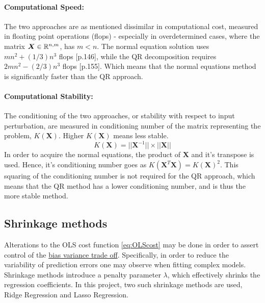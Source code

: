 \documentclass[%
oneside,                 %
final,                   %
10pt]{article}
\begin{document}
\paragraph*{Computational Speed:}
The two approaches are as mentioned dissimilar in computational cost, measured in floating point operations (flops) - especially in overdetermined cases, where the matrix $\bm{X}\in {\Bbb R}^{n,m}$, has $m<n$.
The normal equation solution uses $mn^2
+ (1/3)n^3$ flops \citep{Ascher}[p.146], while the QR decomposition requires $2mn^2−(2/3)n^3$ flops  \citep{Ascher}[p.155]. Which means that the normal equations method is significantly faster than the QR approach.


\paragraph*{Computational Stability:}
The conditioning of the two approaches, or stability with respect to input perturbation, are measured in conditioning number of the matrix representing the problem, $K(\bm{X})$. Higher $K(\bm{X})$ means less stable. 
\begin{equation}
K(\bm{X})=||\bm{X}^{-1}|| \times ||\bm{X}||
\end{equation}
In order to acquire the normal equations, the product of $\bm{X}$ and it's transpose is used. Hence, it's conditioning number goes as $K(\bm{X}^T\bm{X})=K(\bm{X})^2$. This squaring of the conditioning number is not required for the QR approach, which means that the QR method has a lower conditioning number, and is thus the more stable method.

\subsection{Shrinkage methods}
Alterations to the OLS cost function \eqref{eq:OLScost} may be done in order to assert control of the  \hyperref[S:M_Biasvar]{bias variance trade off}. Specifically, in order to reduce the variability of prediction errors one may observe when fitting complex models. Shrinkage methods introduce a penalty parameter $\lambda$, which effectively shrinks the regression coefficients. In this project, two such shrinkage methods are used, Ridge Regression and Lasso Regression. 
\end{document}
